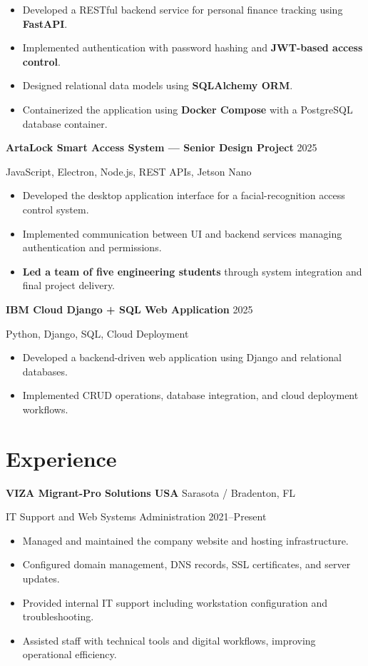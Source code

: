 \documentclass[10pt]{article}
\begin{document}
\begin{itemize}
\item Developed a RESTful backend service for personal finance tracking using \textbf{FastAPI}.
\item Implemented authentication with password hashing and \textbf{JWT-based access control}.
\item Designed relational data models using \textbf{SQLAlchemy ORM}.
\item Containerized the application using \textbf{Docker Compose} with a PostgreSQL database container.
\end{itemize}

\textbf{ArtaLock Smart Access System — Senior Design Project} \hfill 2025

JavaScript, Electron, Node.js, REST APIs, Jetson Nano

\begin{itemize}
\item Developed the desktop application interface for a facial-recognition access control system.
\item Implemented communication between UI and backend services managing authentication and permissions.
\item \textbf{Led a team of five engineering students} through system integration and final project delivery.
\end{itemize}

\textbf{IBM Cloud Django + SQL Web Application} \hfill 2025

Python, Django, SQL, Cloud Deployment

\begin{itemize}
\item Developed a backend-driven web application using Django and relational databases.
\item Implemented CRUD operations, database integration, and cloud deployment workflows.
\end{itemize}

\section{Experience}

\textbf{VIZA Migrant-Pro Solutions USA} \hfill Sarasota / Bradenton, FL

IT Support and Web Systems Administration \hfill 2021–Present

\begin{itemize}
\item Managed and maintained the company website and hosting infrastructure.
\item Configured domain management, DNS records, SSL certificates, and server updates.
\item Provided internal IT support including workstation configuration and troubleshooting.
\item Assisted staff with technical tools and digital workflows, improving operational efficiency.
\end{itemize}
\end{document}
